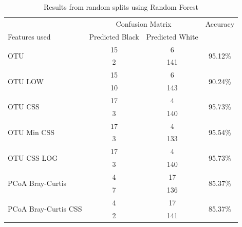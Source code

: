 \begin{table}[!h]
	\centering
	\caption{Results from random splits using Random Forest}
	\label{table:rfrrandom}
	\begin{tabular}{l c  c c}
		\toprule
		&\multicolumn{2}{c}{Confusion Matrix} & Accuracy\\
		Features used & Predicted Black&Predicted White&\\
		\midrule
		\multirow{2}{*}{OTU} &15 &6&\multirow{2}{*}{95.12\%}\\
		&	2&141&\\
		\cmidrule{2-3}
		\multirow{2}{*}{OTU LOW} &15 &6&\multirow{2}{*}{90.24\%}\\
		&	10&143&\\
		\cmidrule{2-3}
		\multirow{2}{*}{OTU CSS}&17 &4&\multirow{2}{*}{95.73\%}\\
		&	 3&140&\\
		\cmidrule{2-3}
		\multirow{2}{*}{OTU Min CSS}&17 &4&\multirow{2}{*}{95.54\%}\\
		&	 3&133&\\
		\cmidrule{2-3}
		\multirow{2}{*}{OTU CSS LOG}&17 &4&\multirow{2}{*}{95.73\%}\\
		&	 3&140&\\
		\cmidrule{2-3}
		\multirow{2}{*}{PCoA Bray-Curtis} &4 &17&\multirow{2}{*}{85.37\%}\\
		&	 7&136&\\
		\cmidrule{2-3}
		\multirow{2}{*}{PCoA Bray-Curtis CSS} &4 &17&\multirow{2}{*}{85.37\%}\\
		&	 2&141&\\
		\bottomrule
	\end{tabular}
	
\end{table}


